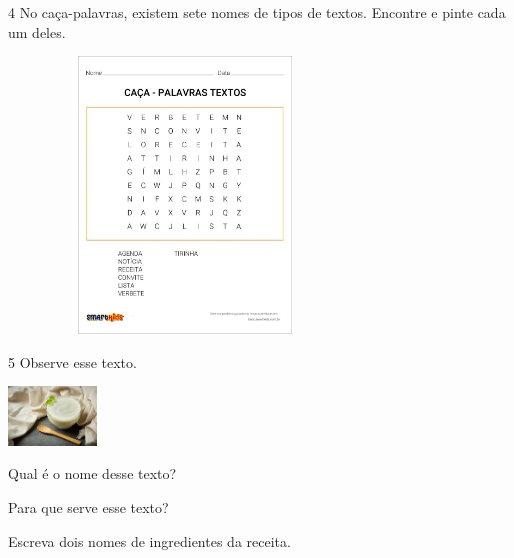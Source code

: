 \num{4} No caça-palavras, existem sete nomes de tipos de textos. 
Encontre e pinte cada um deles.  


\includegraphics[width=3.68829in,height=2.89552in]{media/image104.jpeg}


\num{5} Observe esse texto.


\includegraphics[width=0.92986in,height=0.61875in]{media/image106.jpeg}


\begin{escolha}
\item Qual é o nome desse texto?


\item Para que serve esse texto?


\item Escreva dois nomes de ingredientes da receita.

\end{escolha}

